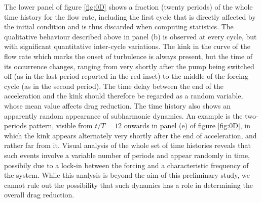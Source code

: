 \documentclass[lineno]{jfm}
\begin{document}
The lower panel of figure \ref{fig:0D} shows a fraction (twenty periods) of the whole time history for the flow rate, including the first cycle that is directly affected by the initial condition and is thus discarded when computing statistics. 
The qualitative behaviour described above in panel (b) is observed at every cycle, but with significant quantitative inter-cycle variations.
The kink in the curve of the flow rate which marks the onset of turbulence is always present, but the time of its occurrence changes, ranging from very shortly after the pump being switched off (as in the last period reported in the red inset) to the middle of the forcing cycle (as in the second period).
The time delay between the end of the acceleration and the kink should therefore be regarded as a random variable, whose mean value affects drag reduction.
The time history also shows an apparently random appearance of subharmonic dynamics. An example is the two-periods pattern, visible from $t/T=12$ onwards in panel (e) of figure \ref{fig:0D}, in which the kink appears alternately very shortly after the end of acceleration, and rather far from it.  
Visual analysis of the whole set of time histories reveals that such events involve a variable number of periods and appear randomly in time, possibily due to a lock-in between the forcing and a characteristic frequency of the system.
While this analysis is beyond the aim of this preliminary study, we cannot rule out the possibility that such dynamics has a role in determining the overall drag reduction.


\end{document}
